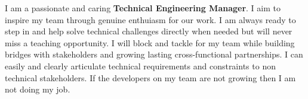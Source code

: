 
\begin{cvsummary}
  \summary
    {I am a passionate and caring \textbf{Technical Engineering Manager}. I aim to inspire my team through genuine enthuiasm for our work. I am always ready to step in and help solve technical challenges directly when needed but will never miss a teaching opportunity. I will block and tackle for my team while building bridges with stakeholders and growing lasting cross-functional partnerships. I can easily and clearly articulate technical requirements and constraints to non technical stakeholders. If the developers on my team are not growing then I am not doing my job.
    }
\end{cvsummary}